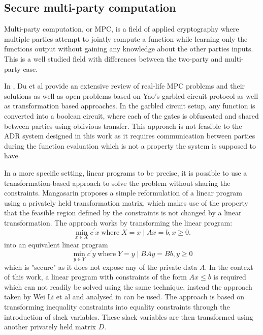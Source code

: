 \documentclass[12pt,msc,a4paper,oneside]{ucl_thesis}
\begin{document}
\subsection{Secure multi-party computation}
Multi-party computation, or MPC, is a field of applied cryptography where multiple parties attempt to jointly compute a function while learning only the functions output without gaining any knowledge about the other parties inputs. This is a well studied field with differences between the two-party and multi-party case. \cite{goldreich1998secure}

In \cite{du2001secure}, Du et al provide an extensive review of real-life MPC problems and their solutions as well as open problems based on Yao's garbled circuit protocol \cite{yao1982protocols} as well as transformation based approaches. In the garbled circuit setup, any function is converted into a boolean circuit, where each of the gates is obfuscated and shared between parties using oblivious transfer. This approach is not feasible to the ADR system designed in this work as it requires communication between parties during the function evaluation which is not a property the system is supposed to have.

In a more specific setting, linear programs to be precise, it is possible to use a transformation-based approach to solve the problem without sharing the constraints. Mangasarin \cite{Mangasarian2012} proposes a simple reformulation of a linear program using a privately held transformation matrix, which makes use of the property that the feasible region defined by the constraints is not changed by a linear transformation. The approach works by transforming the linear program:
\begin{equation}
    \min_{x\in X}c^\prime x \;\textrm{where}\; X ={x \mid Ax=b, x≥0}.
\end{equation}
into an equivalent linear program
\begin{equation}
    \min_{y\in Y}c^\prime y \;\textrm{where}\; Y ={y \mid BAy=Bb, y≥0}
\end{equation}
which is "secure" as it does not expose any of the private data $A$. In the context of this work, a linear program with constraints of the form $Ax\leq b$ is required which can not readily be solved using the same technique, instead the approach taken by Wei Li et al \cite{Li2013} and analysed in \cite{vaidya2009privacy} can be used. The approach is based on transforming inequality constraints into equality constraints through the introduction of slack variables. These slack variables are then transformed using another privately held matrix $D$.
\end{document}
